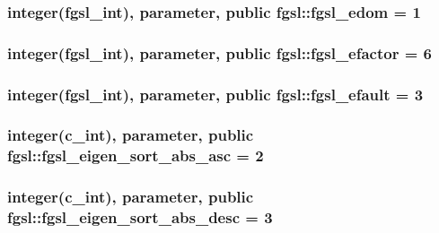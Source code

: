 \hypertarget{classfgsl_a4a331f3c353a431cb6975bbe8e0cbf63}{
\subsubsection[{fgsl\-\_\-edom}]{\setlength{\rightskip}{0pt plus 5cm}integer({\bf fgsl\-\_\-int}), parameter, public fgsl\-::fgsl\-\_\-edom = 1}}\label{classfgsl_a4a331f3c353a431cb6975bbe8e0cbf63}
\hypertarget{classfgsl_a027973d6b14562a967273973aed85e4f}{
\subsubsection[{fgsl\-\_\-efactor}]{\setlength{\rightskip}{0pt plus 5cm}integer({\bf fgsl\-\_\-int}), parameter, public fgsl\-::fgsl\-\_\-efactor = 6}}\label{classfgsl_a027973d6b14562a967273973aed85e4f}
\hypertarget{classfgsl_a3866fec8a527d4830fa9b88464c52417}{
\subsubsection[{fgsl\-\_\-efault}]{\setlength{\rightskip}{0pt plus 5cm}integer({\bf fgsl\-\_\-int}), parameter, public fgsl\-::fgsl\-\_\-efault = 3}}\label{classfgsl_a3866fec8a527d4830fa9b88464c52417}
\hypertarget{classfgsl_a5cf81e4e6e4b769e96ca69bea62e2d14}{
\subsubsection[{fgsl\-\_\-eigen\-\_\-sort\-\_\-abs\-\_\-asc}]{\setlength{\rightskip}{0pt plus 5cm}integer(c\-\_\-int), parameter, public fgsl\-::fgsl\-\_\-eigen\-\_\-sort\-\_\-abs\-\_\-asc = 2}}\label{classfgsl_a5cf81e4e6e4b769e96ca69bea62e2d14}
\hypertarget{classfgsl_a0ed0d4f25aa5ae03cb6adfe004cf648e}{
\subsubsection[{fgsl\-\_\-eigen\-\_\-sort\-\_\-abs\-\_\-desc}]{\setlength{\rightskip}{0pt plus 5cm}integer(c\-\_\-int), parameter, public fgsl\-::fgsl\-\_\-eigen\-\_\-sort\-\_\-abs\-\_\-desc = 3}}\label{classfgsl_a0ed0d4f25aa5ae03cb6adfe004cf648e}
